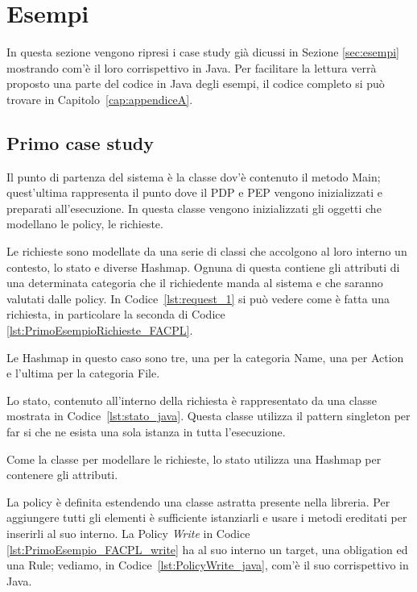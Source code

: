 \section{Esempi}
\label{sec:implementazione_esempi}

In questa sezione vengono ripresi i case study già dicussi in Sezione \ref{sec:esempi} mostrando com'è il loro corrispettivo in Java. 
Per facilitare la lettura verrà proposto una parte del codice in Java degli esempi, il codice completo si può trovare in Capitolo~\ref{cap:appendiceA}.


\subsection{Primo case study}
\label{sub:primo_std_java}


Il punto di partenza del sistema è la classe dov'è contenuto il metodo Main; quest'ultima rappresenta il punto dove il \ac{PDP} e \ac{PEP} vengono inizializzati e preparati all'esecuzione. In questa classe vengono inizializzati gli oggetti che modellano le policy, le richieste. \par
Le richieste sono modellate da una serie di classi che accolgono al loro interno un contesto, lo stato e diverse Hashmap. Ognuna di questa contiene gli attributi di una determinata categoria che il richiedente manda al sistema e che saranno valutati dalle policy. In Codice~\ref{lst:request_1} si può vedere come è fatta una richiesta, in particolare la seconda di Codice \ref{lst:PrimoEsempioRichieste_FACPL}.

Le Hashmap in questo caso sono tre, una per la categoria Name, una per Action e l'ultima per la categoria File. \par
Lo stato, contenuto all'interno della richiesta è rappresentato da una classe mostrata in Codice~\ref{lst:stato_java}. Questa classe utilizza il pattern singleton per far si che ne esista una sola istanza in tutta l'esecuzione. 

Come la classe per modellare le richieste, lo stato utilizza una Hashmap per contenere gli attributi.\par
La policy è definita estendendo una classe astratta presente nella libreria. Per aggiungere tutti gli elementi è sufficiente istanziarli e usare i metodi ereditati per inserirli al suo interno.
La Policy \textit{Write} in Codice \ref{lst:PrimoEsempio_FACPL_write} ha al suo interno un target, una obligation ed una Rule; vediamo, in Codice~\ref{lst:PolicyWrite_java}, com'è il suo corrispettivo in Java.
